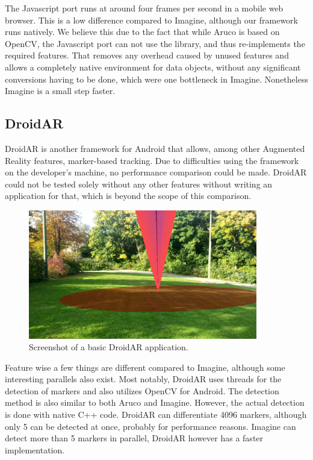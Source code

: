 The Javascript port runs at around four frames per second in a mobile web browser.
This is a low difference compared to Imagine, although our framework runs natively.
We believe this due to the fact that while Aruco is based on OpenCV, the Javascript port can not use the library, and thus re-implements the required features.
That removes any overhead caused by unused features and allows a completely native environment for data objects, without any significant conversions having to be done, which were one bottleneck in Imagine.
Nonetheless Imagine is a small step faster.

\subsection{DroidAR}

DroidAR \cite{droidar} is another framework for Android that allows, among other Augmented Reality features, marker-based tracking.
Due to difficulties using the framework on the developer's machine, no performance comparison could be made.
DroidAR could not be tested solely without any other features without writing an application for that, which is beyond the scope of this comparison.

\begin{figure}[H]
	\centering
	\includegraphics[width=10cm]{img/droidar.png}
	\caption[DroidAR]{Screenshot of a basic DroidAR application.}
	\label{fig:droidar}
\end{figure}

Feature wise a few things are different compared to Imagine, although some interesting parallels also exist.
Most notably, DroidAR uses threads for the detection of markers and also utilizes OpenCV for Android.
The detection method is also similar to both Aruco and Imagine.
However, the actual detection is done with native C++ code.
DroidAR can differentiate 4096 markers, although only 5 can be detected at once, probably for performance reasons.
Imagine can detect more than 5 markers in parallel, DroidAR however has a faster implementation.
